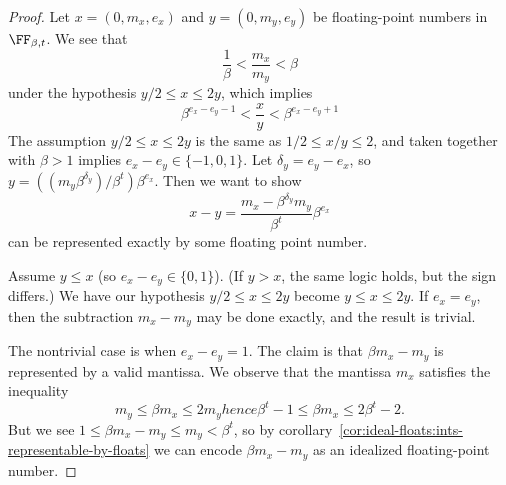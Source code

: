 \begin{proof}
  Let $x = (0, m_{x}, e_{x})$ and $y=(0,m_{y},e_{y})$ be floating-point
  numbers in $\FF_{\beta,t}$. We see that
  \begin{equation}
   \frac{1}{\beta} < \frac{m_{x}}{m_{y}} < \beta
  \end{equation}
  under the hypothesis $y/2\leq x\leq 2y$, which implies
  \begin{equation}
    \beta^{e_{x}-e_{y}-1} < \frac{x}{y} < \beta^{e_{x}-e_{y}+1}
  \end{equation}
  The assumption $y/2\leq x\leq 2y$ is the same as $1/2\leq x/y\leq 2$,
  and taken together with $\beta>1$ 
  implies $e_{x}-e_{y}\in\{-1,0,1\}$. Let $\delta_{y}=e_{y}-e_{x}$, so
  $y = ((m_{y}\beta^{\delta_{y}})/\beta^{t})\beta^{e_{x}}$. Then we want
  to show
  \begin{equation}
    x-y = \frac{m_{x} - \beta^{\delta_{y}}m_{y}}{\beta^{t}}\beta^{e_{x}}
  \end{equation}
  can be represented exactly by some floating point number.

  Assume $y\leq x$ (so $e_{x}-e_{y}\in\{0,1\}$). (If $y > x$, the same
  logic holds, but the sign differs.) We have our hypothesis
  $y/2\leq x\leq 2y$ become $y\leq x\leq 2y$. If $e_{x}=e_{y}$, then the
  subtraction $m_{x}-m_{y}$ may be done exactly, and the result is
  trivial.

  The nontrivial case is when $e_{x}-e_{y}=1$. The claim is that
  $\beta m_{x}-m_{y}$ is represented by a valid mantissa. We observe
  that the mantissa $m_{x}$ satisfies the inequality
  \begin{subequations}
  \begin{equation}
    m_{y} \leq \beta m_{x} \leq 2m_{y}
  \end{equation}
  hence
  \begin{equation}\label{eq:sternbez-lemma:bounds-on-x-mantissa}
    \beta^{t}-1\leq \beta m_{x}\leq 2\beta^{t}-2.
  \end{equation}
  \end{subequations}
  But we see $1\leq \beta m_{x}-m_{y}\leq m_{y} < \beta^{t}$, so
  by corollary~\ref{cor:ideal-floats:ints-representable-by-floats}
  we can encode $\beta m_{x}-m_{y}$ as an idealized floating-point number.
\end{proof}

